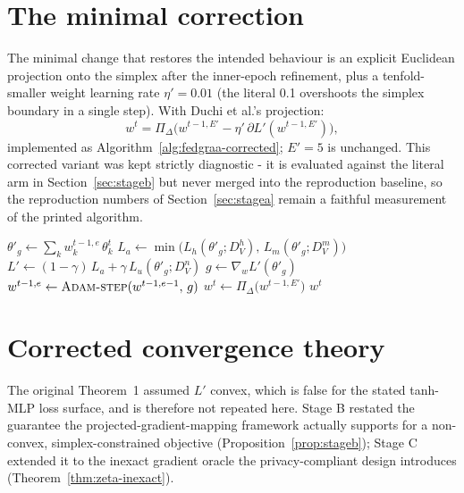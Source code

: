 \documentclass[11pt,a4paper]{report}
\newcommand{\simplex}{\Delta}
\newcommand{\proj}{\Pi_{\simplex}}
\newcommand{\Lprime}{L'}
\begin{document}
\section{The minimal correction}
\label{sec:correction}

The minimal change that restores the intended behaviour is an explicit
Euclidean projection onto the simplex after the inner-epoch refinement, plus
a tenfold-smaller weight learning rate $\eta'=0.01$ (the literal 0.1
overshoots the simplex boundary in a single step). With Duchi et al.'s
\cite{duchi2008projection} projection:
\begin{equation}
w^t = \proj\bigl(w^{t-1,E'} - \eta'\, \partial \Lprime(w^{t-1,E'})\bigr),
\label{eq:projected-update}
\end{equation}
implemented as Algorithm~\ref{alg:fedgraa-corrected}; $E'=5$ is unchanged.
This corrected variant was kept strictly diagnostic - it is evaluated against
the literal arm in Section~\ref{sec:stageb} but never merged into the
reproduction baseline, so the reproduction numbers of
Section~\ref{sec:stagea} remain a faithful measurement of the printed
algorithm.

\begin{algorithm}[htbp]
\caption{FedGRAA weight update - corrected (proposed)}
\label{alg:fedgraa-corrected}
\begin{algorithmic}[1]
    \State $\theta'_g \gets \sum_k w_k^{t-1,e}\, \theta_k^t$
    \State $L_a \gets \min\bigl(L_h(\theta'_g; D_V^h),\, L_m(\theta'_g; D_V^m)\bigr)$
    \State $\Lprime \gets (1-\gamma)\, L_a + \gamma\, L_u(\theta'_g; D_V^n)$
    \State $g \gets \nabla_w \Lprime(\theta'_g)$
    \State $w^{t-1,e} \gets \Call{Adam-step}{w^{t-1,e-1},\, g}$
  \EndFor
  \State $w^t \gets \proj\bigl(w^{t-1,E'}\bigr)$
  \State \Return $w^t$
\EndProcedure
\end{algorithmic}
\end{algorithm}

\section{Corrected convergence theory}
\label{sec:corrected-theory}

The original Theorem~1 assumed $\Lprime$ convex, which is false for the
stated tanh-MLP loss surface, and is therefore not repeated here. Stage B
restated the guarantee the projected-gradient-mapping framework actually
supports for a non-convex, simplex-constrained objective
(Proposition~\ref{prop:stageb}); Stage C extended it to the inexact gradient
oracle the privacy-compliant design introduces
(Theorem~\ref{thm:zeta-inexact}).
\end{document}
